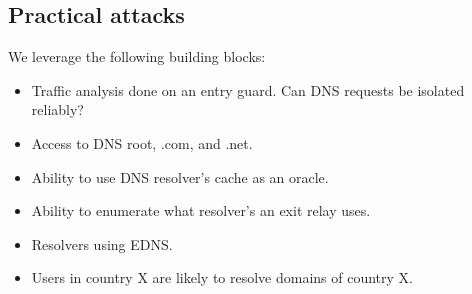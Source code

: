 \subsection{Practical attacks}
We leverage the following building blocks:
\begin{itemize}
	\item Traffic analysis done on an entry guard.  Can DNS requests be isolated
		reliably?
	\item Access to DNS root, .com, and .net.
	\item Ability to use DNS resolver's cache as an oracle.
	\item Ability to enumerate what resolver's an exit relay uses.
	\item Resolvers using EDNS.
	\item Users in country X are likely to resolve domains of country X.
\end{itemize}
